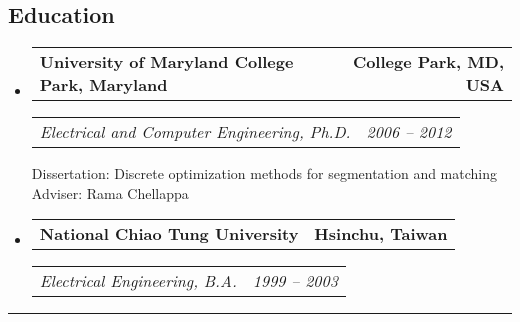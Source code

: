 \documentclass[10pt,letterpaper]{article}
\makeatletter
\newcommand{\headerrow}[2]
{\begin{tabular*}{\linewidth}{l@{\extracolsep{\fill}}r}
	#1 &
	#2 \\
\end{tabular*}}
\makeatother
\begin{document}
\subsection*{Education}
\begin{itemize}
	\parskip=0.1em
	\item
	\headerrow
		{\textbf{University of Maryland College Park, Maryland}}
		{\textbf{College Park, MD, USA}}
	\headerrow
		{\emph{Electrical and Computer Engineering, Ph.D.}}
		{\emph{2006 -- 2012}}
		Dissertation: Discrete optimization methods for segmentation and matching\\
		Adviser: Rama Chellappa
	\item
	\headerrow
		{\textbf{National Chiao Tung University}}
		{\textbf{Hsinchu, Taiwan}}
	\headerrow
		{\emph{Electrical Engineering, B.A.}}
		{\emph{1999 -- 2003}}
\end{itemize}
\hrule
\vspace{-0.4em}
\end{document}
